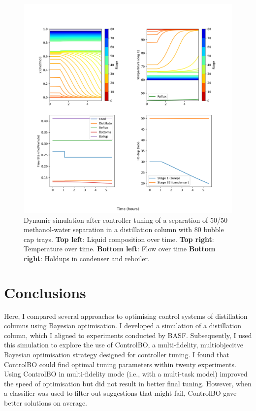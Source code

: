 \begin{figure}
    \centering
    \includegraphics[width=\textwidth]{gfx/Chapter06/mt_c_dynamic.png}
    \caption{Dynamic simulation after controller tuning of a separation of 50/50 methanol-water separation in a distillation column with 80 bubble cap trays. \textbf{Top left}: Liquid composition over time. \textbf{Top right}: Temperature over time. \textbf{Bottom left}: Flow over time \textbf{Bottom right}: Holdups in condenser and reboiler.}
    \label{fig:dynamic_after_tuning}
\end{figure}

\section{Conclusions}

Here, I compared several approaches to optimising control systems of distillation columns using Bayesian optimisation. I developed a simulation of a distillation column, which I aligned to experiments conducted by BASF. Subsequently, I used this simulation to explore the use of ControlBO, a multi-fidelity, multiobjecitve Bayesian optimisation strategy designed for controller tuning. I found that ControlBO could find optimal tuning parameters within twenty experiments. Using ControlBO in multi-fidelity mode (i.e., with a multi-task model) improved the speed of optimisation but did not result in better final tuning. However, when a classifier was used to filter out suggestions that might fail, ControlBO gave better solutions on average.

